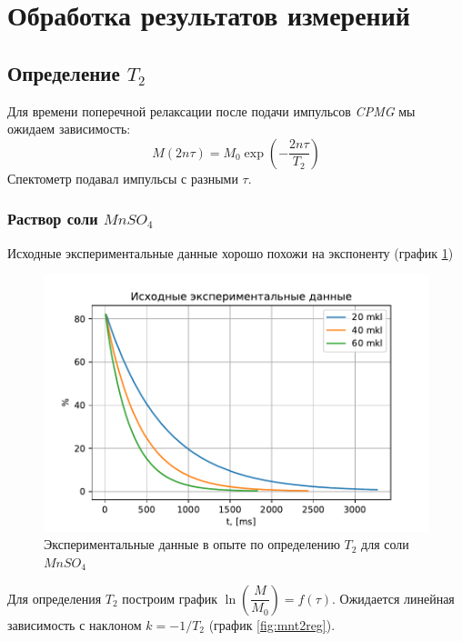 \section{Обработка результатов измерений}
\subsection{Определение $T_2$}
Для времени поперечной релаксации после подачи импульсов \textit{CPMG} мы ожидаем зависимость:
\begin{equation}
\label{eq:M2-from-T2}
M (2n \tau) = M_0 \exp \left( -\dfrac{2n\tau}{T_2} \right)
\end{equation}
Спектометр подавал импульсы с разными $ \tau $.
\subsubsection{Раствор соли $MnSO_4$}
Исходные экспериментальные данные хорошо похожи на экспоненту (график \ref{fig:mnt2exper})
\begin{figure}[h]
	\hspace{-5em}
	\includegraphics[width=1.2\linewidth]{data/Mn_T_2_exper}
	\caption{Экспериментальные данные в опыте по определению $ T_2 $ для соли $ Mn SO_4 $}
	\label{fig:mnt2exper}
\end{figure}

Для определения $ T_2 $ построим график $ \ln \left(\dfrac{M}{M_0} \right) = f(\tau) $. Ожидается линейная зависимость с наклоном $ k = -1/T_2 $ (график \ref{fig:mnt2reg}).

